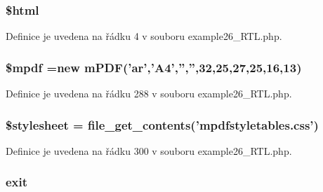 \hypertarget{example26___r_t_l_8php_a6f96e7fc92441776c9d1cd3386663b40}{
\subsubsection[{\$html}]{\setlength{\rightskip}{0pt plus 5cm}\$html}}\label{example26___r_t_l_8php_a6f96e7fc92441776c9d1cd3386663b40}


Definice je uvedena na řádku 4 v souboru example26\-\_\-\-R\-T\-L.\-php.

\hypertarget{example26___r_t_l_8php_ad028f81910d6cbab9b184d2214b3a8f8}{
\subsubsection[{\$mpdf}]{\setlength{\rightskip}{0pt plus 5cm}\$mpdf =new {\bf m\-P\-D\-F}('ar','A4','','',32,25,27,25,16,13)}}\label{example26___r_t_l_8php_ad028f81910d6cbab9b184d2214b3a8f8}


Definice je uvedena na řádku 288 v souboru example26\-\_\-\-R\-T\-L.\-php.

\hypertarget{example26___r_t_l_8php_a19e5cf73e817c55a49205e6ec78c88a8}{
\subsubsection[{\$stylesheet}]{\setlength{\rightskip}{0pt plus 5cm}\$stylesheet = file\-\_\-get\-\_\-contents('mpdfstyletables.\-css')}}\label{example26___r_t_l_8php_a19e5cf73e817c55a49205e6ec78c88a8}


Definice je uvedena na řádku 300 v souboru example26\-\_\-\-R\-T\-L.\-php.

\hypertarget{example26___r_t_l_8php_a6733eb5f605d09eaede9845835d71c4e}{
\subsubsection[{exit}]{\setlength{\rightskip}{0pt plus 5cm}exit}}\label{example26___r_t_l_8php_a6733eb5f605d09eaede9845835d71c4e}


